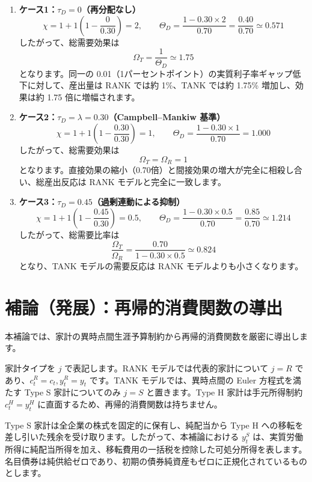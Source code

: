 \documentclass[
  japanese,
  lualatex,
  ja=standard,
  12pt,
  a4paper]{ltjsarticle}
\providecommand{\tightlist}{%
  \setlength{\itemsep}{0pt}\setlength{\parskip}{0pt}}
\begin{document}
\begin{enumerate}
\def\labelenumi{\arabic{enumi}.}
\tightlist
\item
  \textbf{ケース1：\(\tau_D = 0\)（再分配なし）} \[
  \chi = 1 + 1\left( 1 - \frac{0}{0.30} \right) = 2,
  \qquad
  \Theta_D = \frac{1 - 0.30 \times 2}{0.70} = \frac{0.40}{0.70} \simeq 0.571
  \] したがって、総需要効果は \[
  \Omega_T = \frac{1}{\Theta_D} \simeq 1.75
  \] となります。同一の
  0.01（1パーセントポイント）の実質利子率ギャップ低下に対して、産出量は
  RANK では約 1\%、TANK では約 1.75\% 増加し、効果は約 1.75
  倍に増幅されます。
\item
  \textbf{ケース2：\(\tau_D = \lambda = 0.30\)（Campbell--Mankiw 基準）}
  \[
  \chi = 1 + 1\left( 1 - \frac{0.30}{0.30} \right) = 1,
  \qquad
  \Theta_D = \frac{1 - 0.30 \times 1}{0.70} = 1.000
  \] したがって、総需要効果は \[
  \Omega_T = \Omega_R = 1
  \]
  となります。直接効果の縮小（0.70倍）と間接効果の増大が完全に相殺し合い、総産出反応は
  RANK モデルと完全に一致します。
\item
  \textbf{ケース3：\(\tau_D = 0.45\)（過剰連動による抑制）} \[
  \chi = 1 + 1\left( 1 - \frac{0.45}{0.30} \right) = 0.5,
  \qquad
  \Theta_D = \frac{1 - 0.30 \times 0.5}{0.70} = \frac{0.85}{0.70} \simeq 1.214
  \] したがって、総需要比率は \[
  \frac{\Omega_T}{\Omega_R} = \frac{0.70}{1 - 0.30 \times 0.5} \simeq 0.824
  \] となり、TANK モデルの需要反応は RANK モデルよりも小さくなります。
\end{enumerate}

\section{補論（発展）：再帰的消費関数の導出}\label{ux88dcux8ad6ux767aux5c55ux518dux5e30ux7684ux6d88ux8cbbux95a2ux6570ux306eux5c0eux51fa}

本補論では、家計の異時点間生涯予算制約から再帰的消費関数を厳密に導出します。

家計タイプを \(j\) で表記します。RANK モデルでは代表的家計について
\(j=R\) であり、\(c_t^R = c_t, y_t^R = y_t\) です。TANK
モデルでは、異時点間の Euler 方程式を満たす Type S 家計についてのみ
\(j=S\) と置きます。Type H 家計は手元所得制約 \(c_t^H = y_t^H\)
に直面するため、再帰的消費関数は持ちません。

Type S 家計は全企業の株式を固定的に保有し、純配当から Type H
への移転を差し引いた残余を受け取ります。したがって、本補論における
\(y_t^S\)
は、実質労働所得に純配当所得を加え、移転費用の一括税を控除した可処分所得を表します。名目債券は純供給ゼロであり、初期の債券純資産もゼロに正規化されているものとします。
\end{document}

